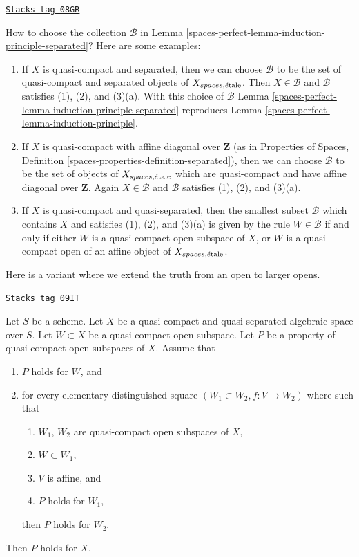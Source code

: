 \begin{remark}[How to]
\label{spaces-perfect-remark-how-to}
\href{https://stacks.math.columbia.edu/tag/08GR}{\texttt{Stacks tag 08GR}}

How to choose the collection $\mathcal{B}$ in
Lemma \ref{spaces-perfect-lemma-induction-principle-separated}?
Here are some examples:
\begin{enumerate}
\item If $X$ is quasi-compact and separated, then we can choose
$\mathcal{B}$ to be the set of quasi-compact and separated objects
of $X_{spaces, \acute{e}\text{tale}}$. Then $X \in \mathcal{B}$ and $\mathcal{B}$
satisfies (1), (2), and (3)(a). With this choice of $\mathcal{B}$
Lemma \ref{spaces-perfect-lemma-induction-principle-separated} reproduces
Lemma \ref{spaces-perfect-lemma-induction-principle}.
\item If $X$ is quasi-compact with affine diagonal
over $\mathbf{Z}$ (as in Properties of Spaces, Definition
\ref{spaces-properties-definition-separated}), then we can choose
$\mathcal{B}$ to be the set of objects
of $X_{spaces, \acute{e}\text{tale}}$ which are quasi-compact and have affine
diagonal over $\mathbf{Z}$. Again $X \in \mathcal{B}$ and $\mathcal{B}$
satisfies (1), (2), and (3)(a).
\item If $X$ is quasi-compact and quasi-separated, then the
smallest subset $\mathcal{B}$ which contains $X$ and satisfies
(1), (2), and (3)(a) is given by the rule $W \in \mathcal{B}$ if and only
if either $W$ is a quasi-compact open subspace of $X$, or
$W$ is a quasi-compact open of an affine object of $X_{spaces, \acute{e}\text{tale}}$.
\end{enumerate}
\end{remark}

Here is a variant where we extend the truth from an open to larger opens.

\begin{lemma}
\label{spaces-perfect-lemma-induction-principle-enlarge}
\href{https://stacks.math.columbia.edu/tag/09IT}{\texttt{Stacks tag 09IT}}

Let $S$ be a scheme. Let $X$ be a quasi-compact and quasi-separated
algebraic space over $S$. Let $W \subset X$ be a quasi-compact open
subspace. Let $P$ be a property of quasi-compact open subspaces of $X$.
Assume that
\begin{enumerate}
\item $P$ holds for $W$, and
\item for every elementary distinguished square
$(W_1 \subset W_2, f : V \to W_2)$ where
such that
\begin{enumerate}
\item $W_1$, $W_2$ are quasi-compact open subspaces of $X$,
\item $W \subset W_1$,
\item $V$ is affine, and
\item $P$ holds for $W_1$,
\end{enumerate}
then $P$ holds for $W_2$.
\end{enumerate}
Then $P$ holds for $X$.
\end{lemma}

